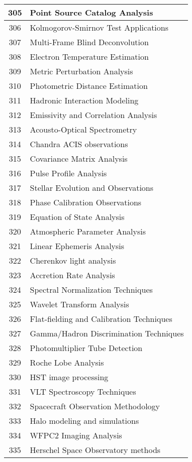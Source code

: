 \begin{table}[htbp]
\begin{tabular}{|c|l|}
\hline
305 & Point Source Catalog Analysis \\
\hline
306 & Kolmogorov-Smirnov Test Applications \\
\hline
307 & Multi-Frame Blind Deconvolution \\
\hline
308 & Electron Temperature Estimation \\
\hline
309 & Metric Perturbation Analysis \\
\hline
310 & Photometric Distance Estimation \\
\hline
311 & Hadronic Interaction Modeling \\
\hline
312 & Emissivity and Correlation Analysis \\
\hline
313 & Acousto-Optical Spectrometry \\
\hline
314 & Chandra ACIS observations \\
\hline
315 & Covariance Matrix Analysis \\
\hline
316 & Pulse Profile Analysis \\
\hline
317 & Stellar Evolution and Observations \\
\hline
318 & Phase Calibration Observations \\
\hline
319 & Equation of State Analysis \\
\hline
320 & Atmospheric Parameter Analysis \\
\hline
321 & Linear Ephemeris Analysis \\
\hline
322 & Cherenkov light analysis \\
\hline
323 & Accretion Rate Analysis \\
\hline
324 & Spectral Normalization Techniques \\
\hline
325 & Wavelet Transform Analysis \\
\hline
326 & Flat-fielding and Calibration Techniques \\
\hline
327 & Gamma/Hadron Discrimination Techniques \\
\hline
328 & Photomultiplier Tube Detection \\
\hline
329 & Roche Lobe Analysis \\
\hline
330 & HST image processing \\
\hline
331 & VLT Spectroscopy Techniques \\
\hline
332 & Spacecraft Observation Methodology \\
\hline
333 & Halo modeling and simulations \\
\hline
334 & WFPC2 Imaging Analysis \\
\hline
335 & Herschel Space Observatory methods \\

\end{tabular}
\end{table}
